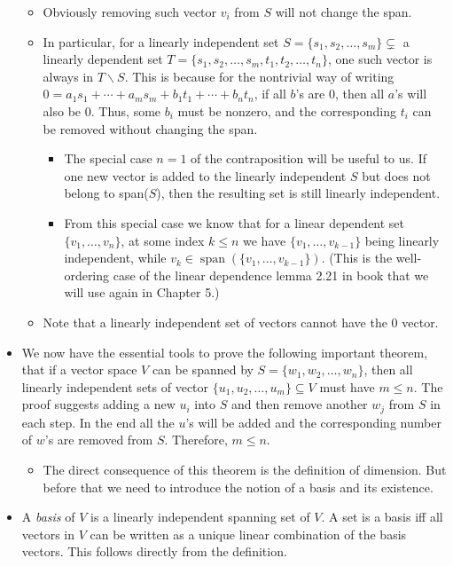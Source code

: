 \documentclass{article}
\newcommand{\s}{\operatorname{span}}
\begin{document}
\begin{itemize}
    \begin{itemize}
        \item Obviously removing such vector $v_i$ from $S$ will not change the span.
        \item In particular, for a linearly independent set $S = \{s_1, s_2, \dots , s_m\} \subsetneq$ a linearly dependent set $T = \{s_1, s_2, \dots , s_m, t_1, t_2, \dots , t_n\}$, one such vector is always in $T \backslash S$. This is because for the nontrivial way of writing $0 = a_1s_1 + \cdots +a_ms_m + b_1 t_1 + \cdots + b_n t_n$, if all $b$'s are 0, then all $a$'s will also be 0. Thus, some $b_i$ must be nonzero, and the corresponding $t_i$ can be removed without changing the span.
        \begin{itemize}
            \item The special case $n=1$ of the contraposition will be useful to us. If one new vector is added to the linearly independent $S$ but does not belong to span($S$), then the resulting set is still linearly independent.
            \item From this special case we know that for a linear dependent set $\{v_1,\dots,v_n\}$, at some index $k \leq n$ we have $\{v_1,\dots,v_{k-1}\}$ being linearly independent, while $v_k \in \s(\{v_1,\dots,v_{k-1}\})$. (This is the well-ordering case of the linear dependence lemma 2.21 in book that we will use again in Chapter 5.)
        \end{itemize}
        \item Note that a linearly independent set of vectors cannot have the $0$ vector.
    \end{itemize}
    \item We now have the essential tools to prove the following important theorem, that if a vector space $V$ can be spanned by $S = \{w_1, w_2, \dots,w_n\}$, then all linearly independent sets of vector $\{u_1,u_2,\dots,u_m\} \subseteq V$ must have $m \leq n$. The proof suggests adding a new $u_i$ into $S$ and then remove another $w_j$ from $S$ in each step. In the end all the $u$'s will be added and the corresponding number of $w$'s are removed from $S$. Therefore, $m \leq n$.
    \begin{itemize}
        \item The direct consequence of this theorem is the definition of dimension. But before that we need to introduce the notion of a basis and its existence.
    \end{itemize}
    \item A \textit{basis} of $V$ is a linearly independent spanning set of $V$. A set is a basis iff all vectors in $V$ can be written as a unique linear combination of the basis vectors. This follows directly from the definition.

\end{itemize}
\end{document}
